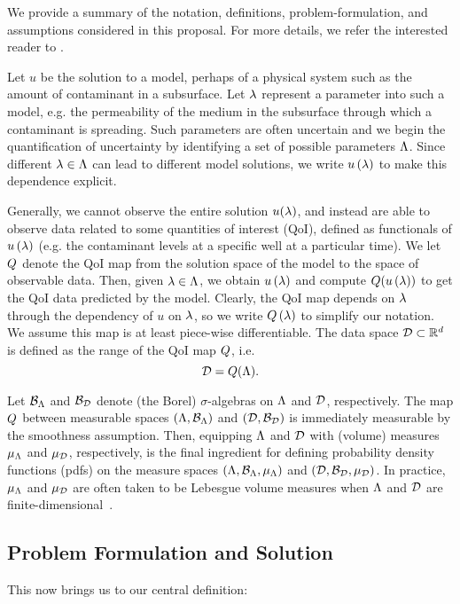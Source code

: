We provide a summary of the notation, definitions, problem-formulation, and assumptions considered in this proposal. 
For more details,  we refer the interested reader to \cite{BES12, BE13, BET+14}. 

Let $u$ be the solution to a model, perhaps of a physical system such as the amount of contaminant in a subsurface. 
Let $\lambda$ represent a parameter into such a model, e.g. the permeability of the medium in the subsurface through which a contaminant is spreading.
Such parameters are often uncertain and we begin the quantification of uncertainty by identifying a set of possible parameters ${\Lambda}$.
Since different $\lambda \in {\Lambda}$ can lead to different model solutions, we write $u\left ( \lambda \right )$ to make this dependence explicit.

Generally, we cannot observe the entire solution $u(\lambda)$, and instead are able to observe data related to some quantities of interest (QoI), defined as functionals of $u\left ( \lambda \right )$ (e.g. the contaminant levels at a specific well at a particular time).
We let $Q$ denote the QoI map from the solution space of the model to the space of observable data. 
Then, given $\lambda \in {\Lambda}$, we obtain $u\left ( \lambda \right )$ and compute $Q(u\left ( \lambda \right ))$ to get the QoI data predicted by the model.
Clearly, the QoI map depends on $\lambda$ through the dependency of $u$ on $\lambda$, so we write $Q\left ( \lambda \right )$ to simplify our notation.
We assume this map is at least piece-wise differentiable.	
The data space $\mathcal{D} \subset \mathbb{R}^d$ is defined as the range of the QoI map $Q$, i.e. 
\[
\mathcal{D} = Q({\Lambda}).
\]

Let $\mathcal{B}_{{\Lambda}}$ and $\mathcal{B}_{\mathcal{D}}$ denote (the Borel) $\sigma$-algebras on ${\Lambda}$ and $\mathcal{D}$, respectively.
The map $Q$ between measurable spaces $({\Lambda}, \mathcal{B}_{{\Lambda}})$ and $(\mathcal{D}, \mathcal{B}_{\mathcal{D}})$ is immediately measurable by the smoothness assumption. 
Then, equipping ${\Lambda}$ and $\mathcal{D}$ with (volume) measures $\mu_{{\Lambda}}$ and $\mu_{\mathcal{D}}$, respectively, is the final ingredient for defining probability density functions (pdfs) on the measure spaces $({\Lambda}, \mathcal{B}_{{\Lambda}}, \mu_{{\Lambda}})$ and $(\mathcal{D}, \mathcal{B}_{\mathcal{D}}, \mu_{\mathcal{D}})$.
In practice, $\mu_{{\Lambda}}$ and $\mu_{\mathcal{D}}$ are often taken to be Lebesgue volume measures when ${\Lambda}$ and $\mathcal{D}$ are finite-dimensional~\cite{BET+14, BJW18}.


\subsection{Problem Formulation and Solution}
This now brings us to our central definition:

